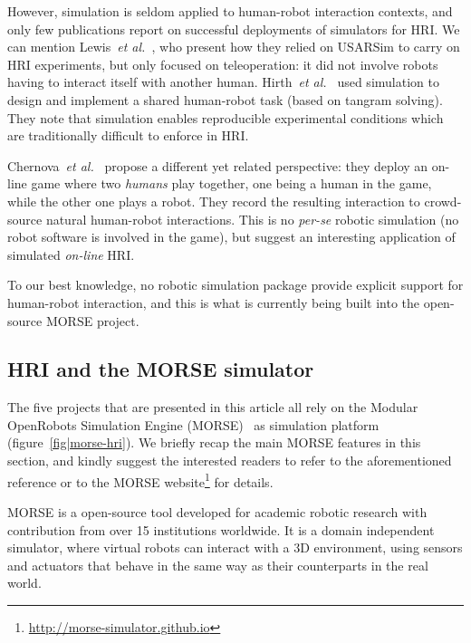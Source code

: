 \documentclass[conference]{IEEEtran}
\newcommand{\etal}{{\textit{et al.~}}}
\begin{document}
However, simulation is seldom applied to human-robot interaction contexts, and
only few publications report on successful deployments of simulators for HRI.
We can mention Lewis~\etal\cite{lewis2007usarsim}, who present how they relied
on {\sc USARSim} to carry on HRI experiments, but only focused on
teleoperation: it did not involve robots having to interact itself with another
human.  Hirth~\etal\cite{hirth2013development} used simulation to design and
implement a shared human-robot task (based on tangram solving). They note that
simulation enables reproducible experimental conditions which are traditionally
difficult to enforce in HRI.

Chernova~\etal\cite{Chernova2011} propose a different yet related perspective:
they deploy an on-line game where two \emph{humans} play together, one being a
human in the game, while the other one plays a robot. They record the resulting
interaction to crowd-source natural human-robot interactions. This is no
\textit{per-se} robotic simulation (no robot software is involved in the game),
but suggest an interesting application of simulated \emph{on-line} HRI.




To our best knowledge, no robotic simulation package provide explicit support
for human-robot interaction, and this is what is currently being built into the
open-source MORSE project.

\subsection*{HRI and the MORSE simulator}

The five projects that are presented in this article all rely on the Modular
OpenRobots Simulation Engine (MORSE)~\cite{Echeverria2011, morse_simpar_2012} as
simulation platform (figure~\ref{fig|morse-hri}). We briefly recap the main
MORSE features in this section, and kindly suggest the interested readers to
refer to the aforementioned reference or to the MORSE
website\footnote{\url{http://morse-simulator.github.io}} for details.

MORSE is a open-source tool developed for academic robotic research with
contribution from over 15 institutions worldwide. It is a domain independent
simulator, where virtual robots can interact with a 3D environment, using
sensors and actuators that behave in the same way as their counterparts in the
real world.
\end{document}
